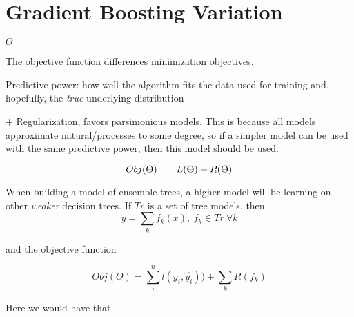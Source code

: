 \section{Gradient Boosting Variation}


$\Theta$

The objective function differences minimization objectives. 

Predictive power: how well the algorithm fits the data used for training and, hopefully, the \textit{true} underlying distribution

+ Regularization, favors parsimonious models. This is because all models approximate natural/processes to some degree, so if a simpler model can be used with the same predictive power, then this model should be used.  

\begin{equation} \label{eq:objFunction}
Obj(\Theta) \ = \ L(\Theta) + R(\Theta)
\\
\end{equation}

When building a model of ensemble trees, a higher model will be learning on other \textit{weaker} decision trees. If $Tr$ is a set of tree models, then
\[ y = \sum_k f_k(x) , \ f_k \in Tr \ \forall k \]
 
and the objective function 
 
\[ Obj(\Theta) = \sum_i^n l(y_i,\hat{y_i}))  +  \sum_k R(f_k) \] 

%    

Here we would have that 



